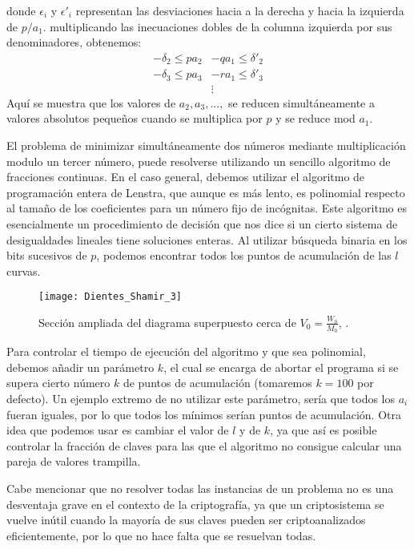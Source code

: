    donde $\epsilon_{i}$ y $\epsilon'_{i}$ representan las desviaciones hacia a la derecha y hacia la izquierda de $p/a_{1}$. multiplicando las inecuaciones dobles de la columna izquierda por sus denominadores, obtenemos:
    \begin{align}
        -\delta_{2} \leq pa_{2} &- qa_{1} \leq \delta'_{2} \\
        -\delta_{3} \leq pa_{3} &- ra_{1} \leq \delta'_{3} \\
        &\vdots
    \end{align}
    Aquí se muestra que los valores de $a_{2}, a_{3}, ... ,$ se reducen simultáneamente a valores absolutos pequeños cuando se multiplica por $p$ y se reduce mod $a_{1}$.

    El problema de minimizar simultáneamente dos números mediante multiplicación modulo un tercer número, puede resolverse utilizando un sencillo algoritmo de fracciones continuas. En el caso general, debemos utilizar el algoritmo de programación entera de Lenstra, que aunque es más lento, es polinomial respecto al tamaño de los coeficientes para un número fijo de incógnitas. Este algoritmo es esencialmente un procedimiento de decisión que nos dice si un cierto sistema de desigualdades lineales tiene soluciones enteras. Al utilizar búsqueda binaria en los bits sucesivos de $p$, podemos encontrar todos los puntos de acumulación de las $l$ curvas.

    \begin{figure}[H]
        \centering
        \texttt{[image: Dientes\_Shamir\_3]}
        \caption{Sección ampliada del diagrama superpuesto cerca de $V_{0} = \frac{W_{0}}{M_{0}}$, \cite{artSha}.}
    \end{figure}

    Para controlar el tiempo de ejecución del algoritmo y que sea polinomial, debemos añadir un parámetro $k$, el cual se encarga de abortar el programa si se supera cierto número $k$ de puntos de acumulación (tomaremos $k = 100$ por defecto). Un ejemplo extremo de no utilizar este parámetro, sería que todos los $a_{i}$ fueran iguales, por lo que todos los mínimos serían puntos de acumulación. Otra idea que podemos usar es cambiar el valor de $l$ y de $k$, ya que así es posible controlar la fracción de claves para las que el algoritmo no consigue calcular una pareja de valores trampilla.
    
    \begin{observacion}
        Cabe mencionar que no resolver todas las instancias de un problema no es una desventaja grave en el contexto de la criptografía, ya que un criptosistema se vuelve inútil cuando la mayoría de sus claves pueden ser criptoanalizados eficientemente, por lo que no hace falta que se resuelvan todas.
    \end{observacion}

